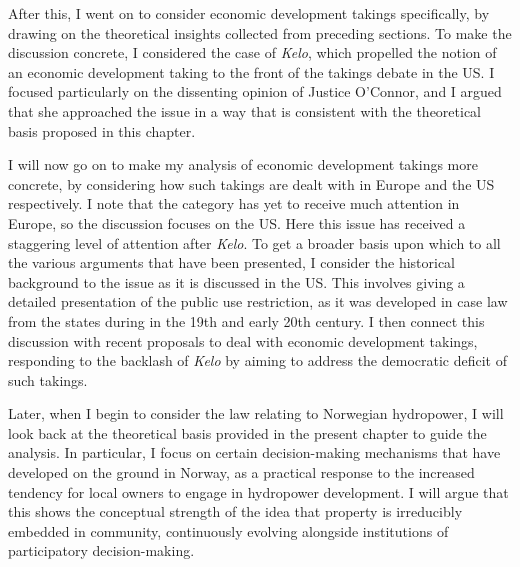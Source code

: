 {After this, I went on to consider economic development takings specifically, by drawing on the theoretical insights collected from preceding sections. To make the discussion concrete, I considered the case of {\it Kelo}, which propelled the notion of an economic development taking to the front of the takings debate in the US. I focused particularly on the dissenting opinion of Justice O'Connor, and I argued that she approached the issue in a way that is consistent with the theoretical basis proposed in this chapter.

I will now go on to make my analysis of economic development takings more concrete, by considering how such takings are dealt with in Europe and the US respectively. I note that the category has yet to receive much attention in Europe, so the discussion focuses on the US. Here this issue has received a staggering level of attention after {\it Kelo}. To get a broader basis upon which to  all the various arguments that have been presented, I consider the historical background to the issue as it is discussed in the US. This involves giving a detailed presentation of the public use restriction, as it was developed in case law from the states during in the 19th and early 20th century. I then connect this discussion with recent proposals to deal with economic development takings, responding to the backlash of {\it Kelo} by aiming to address the democratic deficit of such takings.

Later, when I begin to consider the law relating to Norwegian hydropower, I will look back at the theoretical basis provided in the present chapter to guide the analysis. In particular, I focus on certain decision-making mechanisms that have developed on the ground in Norway, as a practical response to the increased tendency for local owners to engage in hydropower development. I will argue that this shows the conceptual strength of the idea that property is irreducibly embedded in community, continuously evolving alongside institutions of participatory decision-making. }